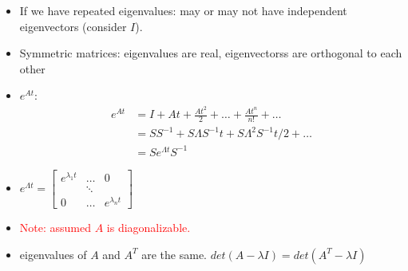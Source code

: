 \documentclass[a4paper,12pt]{article}
\newcommand{\red}[1]{\textcolor{red}{#1}}
\theoremstyle{definition} \newtheorem{Theorem}{Theorem}
\begin{document}
\begin{itemize}
\begin{itemize}
			\item  If we have repeated eigenvalues: may or may not have independent eigenvectors (consider $I$).
			
			\item Symmetric matrices: eigenvalues are real, eigenvectorss are orthogonal to each other

			\item $e^{At}$:
			\begin{align*}
				e^{At} &= I + At + \frac{{At}^2}{2} + \ldots + \frac{{At}^n}{n!} + \ldots \\
						&= SS^{-1} + S \Lambda S^{-1} t + S \Lambda^2 S^{-1} t/2+ \ldots \\
						&= S e^{\Lambda t} S^{-1}
			\end{align*}
			
			\item $e^{\Lambda t} = \begin{bmatrix}e^{\lambda_1 t} & \ldots & 0 \\
				& \ddots & \\
				0 & \ldots & e^{\lambda_n t}
			   \end{bmatrix}$

			\item \red{Note: assumed $A$ is diagonalizable.}
			
			\item eigenvalues of $A$ and $A^T$ are the same. $det(A-\lambda I) = det(A^T - \lambda I)$


		\end{itemize}
\end{itemize}
\end{document}
